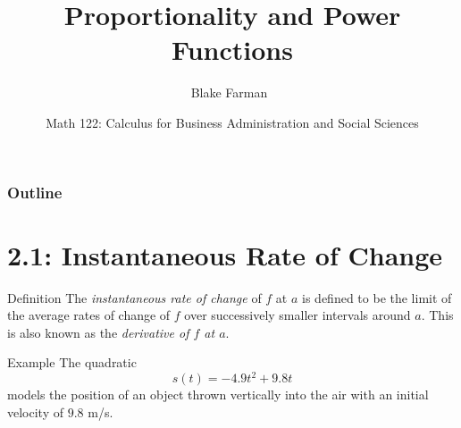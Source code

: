 \documentclass{beamer}
\title %
    {Proportionality and Power Functions}
\author[Farman]
{Blake Farman~\inst{1}}
\institute[USC]{
\inst{1}
University of South Carolina, Columbia, SC USA}
\date[January 17, 2017]
{Math 122: Calculus for Business Administration and Social Sciences}
\theoremstyle{definition}
\begin{document}
\begin{frame}
  \titlepage
\end{frame}

\begin{frame}
  \frametitle{Outline}
  \tableofcontents[pausesections]
\end{frame}

\section{2.1: Instantaneous Rate of Change}
\begin{frame}{Definition}
  The {\it instantaneous rate of change} of $f$ at $a$ is defined to be the limit of the average rates of change of $f$ over successively smaller intervals around $a$.
  This is also known as the {\it derivative of $f$ at $a$}.

\end{frame}

\begin{frame}{Example}
  The quadratic
  $$s(t) = -4.9t^2 + 9.8t$$
  models the position of an object thrown vertically into the air with an initial velocity of $9.8$ m/s.
\end{frame}
\end{document}
